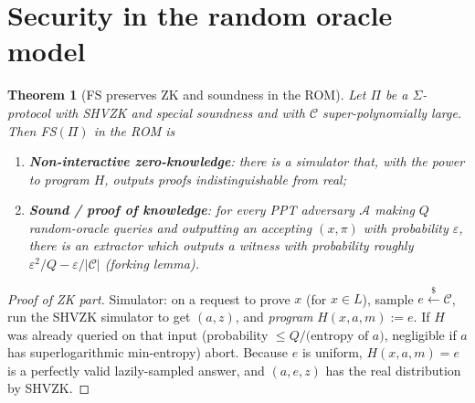 \documentclass[11pt,a4paper]{report}
\theoremstyle{plain}
\newtheorem{theorem}{Theorem}[chapter]
\theoremstyle{definition}
\theoremstyle{remark}
\newcommand{\getsr}{\xleftarrow{\$}}
\begin{document}
\section{Security in the random oracle model}
\begin{theorem}[FS preserves ZK and soundness in the ROM]\label{thm:fs}
Let $\Pi$ be a $\Sigma$-protocol with SHVZK and special soundness and with $\mathcal C$ super-polynomially large. Then FS$(\Pi)$ in the ROM is
\begin{enumerate}
\item \textbf{Non-interactive zero-knowledge}: there is a simulator that, with the power to program $H$, outputs proofs indistinguishable from real;
\item \textbf{Sound / proof of knowledge}: for every PPT adversary $\mathcal A$ making $Q$ random-oracle queries and outputting an accepting $(x,\pi)$ with probability $\varepsilon$, there is an extractor which outputs a witness with probability roughly $\varepsilon^2/Q-\varepsilon/|\mathcal C|$ (forking lemma).
\end{enumerate}
\end{theorem}
\begin{proof}[Proof of ZK part]
Simulator: on a request to prove $x$ (for $x\in L$), sample $e\getsr\mathcal C$, run the SHVZK simulator to get $(a,z)$, and \emph{program} $H(x,a,m):=e$. If $H$ was already queried on that input (probability $\le Q/\text{(entropy of }a)$, negligible if $a$ has superlogarithmic min-entropy) abort. Because $e$ is uniform, $H(x,a,m)=e$ is a perfectly valid lazily-sampled answer, and $(a,e,z)$ has the real distribution by SHVZK.
\end{proof}
\end{document}
